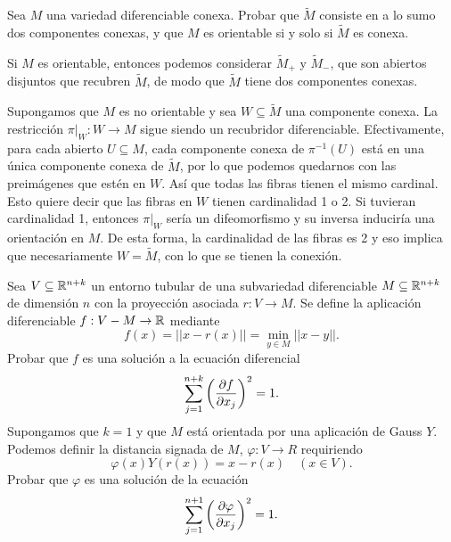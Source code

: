 \documentclass[twoside]{article}
\begin{document}
\begin{ejercicio}{9.16}
Sea $M$ una variedad diferenciable conexa. Probar que $\widetilde{M}$ consiste en a lo sumo dos componentes conexas, y que $M$ es orientable si y solo si $\widetilde{M}$ es conexa.
\end{ejercicio}
\begin{solucion}
Si $M$ es orientable, entonces podemos considerar $\widetilde{M}_+$ y $\widetilde{M}_-$, que son abiertos disjuntos que recubren $\widetilde{M}$, de modo que $\widetilde{M}$ tiene dos componentes conexas.


Supongamos que $M$ es no orientable y sea $W\subseteq\widetilde{M}$ una componente conexa. La restricción $\pi|_W: W\to M$ sigue siendo un recubridor diferenciable. Efectivamente, para cada abierto $U\subseteq M$, cada componente conexa de $\pi^{-1}(U)$ está en una única componente conexa de $\widetilde{M}$, por lo que podemos quedarnos con las preimágenes que estén en $W$. Así que todas las fibras tienen el mismo cardinal. Esto quiere decir que  las fibras en $W$ tienen cardinalidad 1 o 2. Si tuvieran cardinalidad 1, entonces $\pi|_W$ sería un difeomorfismo y su inversa induciría una orientación en $M$. De esta forma, la cardinalidad de las fibras es 2 y eso implica que necesariamente $W=\widetilde{M}$, con lo que se tienen la conexión.
\end{solucion}
\newpage

\begin{ejercicio}{9.17}
Sea $V\subseteq\mathbb{R}^{n+k}$ un entorno tubular de una subvariedad diferenciable $M\subseteq\mathbb{R}^{n+k}$ de dimensión $n$ con la proyección asociada $r:V\to M$. Se define la aplicación diferenciable $f:V-M\to\mathbb{R}$ mediante
\[
f(x)=||x-r(x)||=\min_{y\in M}||x-y||.
\]
Probar que $f$ es una solución a la ecuación diferencial 
\[
\sum_{j=1}^{n+k}\left(\frac{\partial f}{\partial x_j}\right)^2=1.
\]
Supongamos que $k=1$ y que $M$ está orientada por una aplicación de Gauss $Y$. Podemos definir la distancia signada de $M$, $\varphi:V\to R$ requiriendo
\[
\varphi(x)Y(r(x))=x-r(x)\quad (x\in V).
\]
Probar que $\varphi$ es una solución de la ecuación 
\[
\sum_{j=1}^{n+1}\left(\frac{\partial \varphi}{\partial x_j}\right)^2=1.
\]
\end{ejercicio}
\begin{solucion}

\end{solucion}
\newpage
\end{document}
